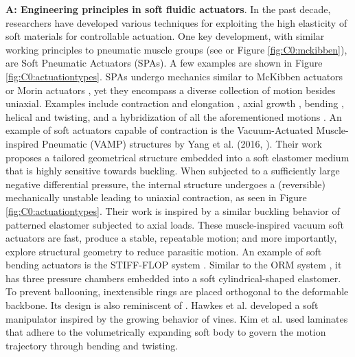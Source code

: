 \vspace{-4mm}
\textbf{A: Engineering principles in soft fluidic actuators}. In the past decade, researchers have developed various techniques for exploiting the high elasticity of soft materials for controllable actuation. One key development, with similar working principles to pneumatic muscle groups (see \cite{Mckibben,Morin1953} or Figure \ref{fig:C0:mckibben}), are Soft Pneumatic Actuators (SPAs). A few examples are shown in Figure \ref{fig:C0:actuationtypes}. SPAs undergo mechanics similar to McKibben actuators \cite{Mckibben} or Morin actuators \cite{Morin1953}, yet they encompass a diverse collection of motion besides uniaxial. Examples include contraction and elongation \cite{Yang2016}, axial growth \cite{Hawkes2017}, bending \cite{Mosadegh2014,Galloway2016,Marchese2016}, helical and twisting, and a hybridization of all the aforementioned motions \cite{Kim2019Aug}. An example of soft actuators capable of contraction is the Vacuum-Actuated Muscle-inspired Pneumatic (VAMP) structures by Yang et al. (2016, \cite{Yang2016}). Their work proposes a tailored geometrical structure embedded into a soft elastomer medium that is highly sensitive towards buckling. When subjected to a sufficiently large negative differential pressure, the internal structure undergoes a (reversible) mechanically unstable leading to uniaxial contraction, as seen in Figure \ref{fig:C0:actuationtypes}. Their work is inspired by a similar buckling behavior of patterned elastomer \cite{Bertoldi2008,Mullin2007,Shim2013Aug} subjected to axial loads. These muscle-inspired vacuum soft actuators are fast, produce a stable, repeatable motion; and more importantly, explore structural geometry to reduce parasitic motion. An example of soft bending actuators is the STIFF-FLOP system \cite{Cianchetti2013Nov}. Similar to the ORM system \cite{BibEntryOrm2019Sep}, it has three pressure chambers embedded into a soft cylindrical-shaped elastomer. To prevent ballooning, inextensible rings are placed orthogonal to the deformable backbone. Its design is also reminiscent of \cite{Suzumori1992,Suzumori1991}. Hawkes et al. \cite{Hawkes2017} developed a soft manipulator inspired by the growing behavior of vines. Kim et al. \cite{Kim2019Aug} used laminates that adhere to the volumetrically expanding soft body to govern the motion trajectory through bending and twisting.

